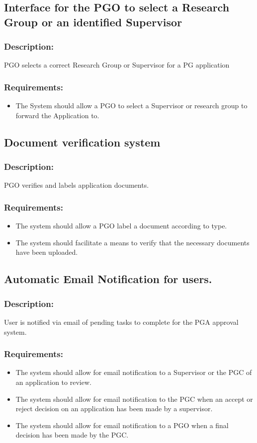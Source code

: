 \documentclass[]{article}
\begin{document}
\subsection{Interface for the PGO to select a Research Group or an identified Supervisor}
\subsubsection{ Description: }PGO selects a correct Research Group or Supervisor for a PG application
\subsubsection{ Requirements:}
\begin{itemize} 
\item  The System should allow a PGO to select a Supervisor or research group to forward the Application to. 
\end{itemize}
\subsection{Document verification system}
\subsubsection{ Description: }PGO verifies and labels application documents.
\subsubsection{ Requirements:}
\begin{itemize}
\item  The system should allow a PGO label a document according to type.
\item  The system should facilitate a means to verify that the necessary documents have been uploaded.
\end{itemize}
\subsection{Automatic Email Notification for users. }
\subsubsection{ Description: }User is notified via email of pending tasks to complete for the PGA approval system.                          
\subsubsection{ Requirements:} 
\begin{itemize}
\item The system should allow for email notification to a Supervisor or the PGC of an application to review.
\item The system should allow for email notification to the PGC when an accept or reject decision on an application has been made by a supervisor.
\item The system should allow for email notification to a PGO when a final decision has been made by the PGC.
\end{itemize}
\end{document}
